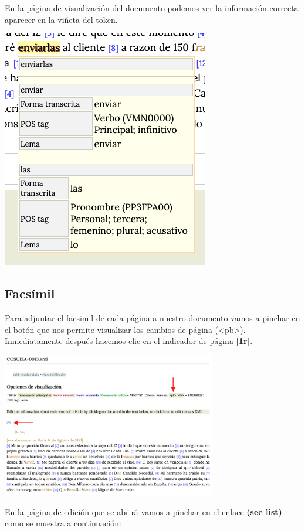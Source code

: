 \documentclass[
]{book}
\begin{document}
En la página de visualización del documento podemos ver la información correcta aparecer en la viñeta del token.

\includegraphics{img/pronombre1.png}

\hypertarget{facsuxedmil}{%
\subsection*{Facsímil}\label{facsuxedmil}}

Para adjuntar el facsimil de cada página a nuestro documento vamos a pinchar en el botón que nos permite visualizar los cambios de página (\textless pb\textgreater). Inmediatamente después hacemos clic en el indicador de página \textbf{{[}1r{]}}.

\includegraphics[width=0.7\textwidth,height=\textheight]{img/fac1.png}

En la página de edición que se abrirá vamos a pinchar en el enlace \textbf{(see list)} como se muestra a continuación:
\end{document}
